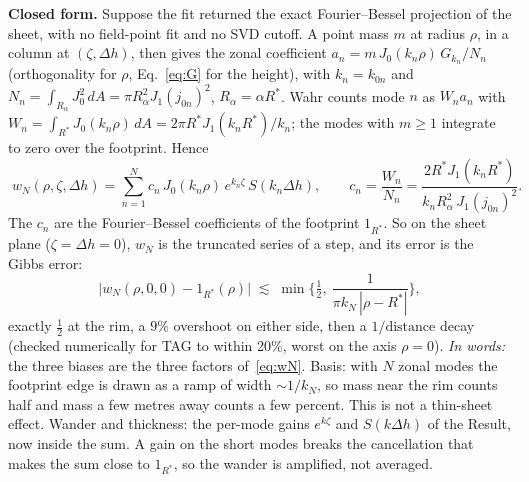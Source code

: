 \documentclass[11pt]{article}
\newcommand{\words}[1]{\emph{In words:} #1}
\begin{document}
\textbf{Closed form.} Suppose the fit returned the exact Fourier--Bessel
projection of the sheet, with no field-point fit and no SVD cutoff. A point
mass $m$ at radius $\rho$, in a column at $(\zeta,\Delta h)$, then gives the
zonal coefficient $a_n=m\,J_0(k_n\rho)\,G_{k_n}/N_n$ (orthogonality for $\rho$,
Eq.~\eqref{eq:G} for the height), with $k_n=k_{0n}$ and
$N_n=\int_{R_\alpha}J_0^2\,dA=\pi R_\alpha^2J_1(j_{0n})^2$, $R_\alpha=\alpha R^*$.
Wahr counts mode $n$ as $W_na_n$ with
$W_n=\int_{R^*}J_0(k_n\rho)\,dA=2\pi R^*J_1(k_nR^*)/k_n$; the modes with
$m\ge1$ integrate to zero over the footprint. Hence
\begin{equation}
  \boxed{\;w_N(\rho,\zeta,\Delta h)=\sum_{n=1}^{N}c_n\,J_0(k_n\rho)\,
  e^{k_n\zeta}\,S(k_n\Delta h),\qquad
  c_n=\frac{W_n}{N_n}=\frac{2R^*J_1(k_nR^*)}{k_nR_\alpha^2\,J_1(j_{0n})^2}.\;}
  \label{eq:wN}
\end{equation}
The $c_n$ are the Fourier--Bessel coefficients of the footprint $1_{R^*}$. So
on the sheet plane ($\zeta=\Delta h=0$), $w_N$ is the truncated series of a
step, and its error is the Gibbs error:
\begin{equation}
  \boxed{\;\big|w_N(\rho,0,0)-1_{R^*}(\rho)\big|\;\lesssim\;
  \min\Big\{\tfrac12,\ \frac{1}{\pi k_N\,|\rho-R^*|}\Big\},\;}
  \label{eq:gibbs}
\end{equation}
exactly $\tfrac12$ at the rim, a $9\%$ overshoot on either side, then a
$1/\text{distance}$ decay (checked numerically for TAG to within 20\%, worst on
the axis $\rho=0$).
\words{the three biases are the three factors of~\eqref{eq:wN}. Basis: with
$N$ zonal modes the footprint edge is drawn as a ramp of width
$\sim1/k_N$, so mass near the rim counts half and mass a few metres away
counts a few percent. This is not a thin-sheet effect. Wander and thickness:
the per-mode gains $e^{k\zeta}$ and $S(k\Delta h)$ of the Result, now inside
the sum. A gain on the short modes breaks the cancellation that makes the
sum close to $1_{R^*}$, so the wander is amplified, not averaged.}
\end{document}
